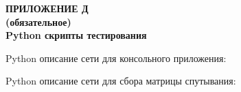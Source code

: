 \clearpage
{}%
\par

\normalsize
\begin{center}
  \textbf{ПРИЛОЖЕНИЕ Д} \\
  \textbf{(обязательное)} \\
  \textbf{Python скрипты тестирования}
\end{center}


Python описание сети для консольного приложения:



Python описание сети для сбора матрицы спутывания:

